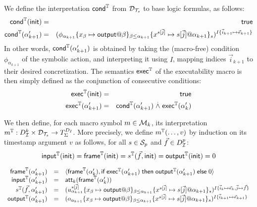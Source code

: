 We define the interpretation $\textsf{cond}^{\mathbb{T}}$ from $\mathcal{D}_{\mathcal{T}_s}$
to base logic formulas, as follows:
\begin{eqnarray*}
  \mcond^\TM(\tinit) &=& \true \\
  \mcond^\TM(\alpha'_{k+1}) &=&
    \interp{\phi_{\alpha_{k+1}}
    \{x_\beta\mapsto\mout@\beta\}_{\beta\leq \alpha_{k+1}}
    \{x^{s[\vec{j}]}\mapsto
      s[\vec{j}]@\alpha_{k+1}\}_s
    }^{I\{\vec{i}_{k+1}\mapsto\vec{e}_{k+1}\}}
\end{eqnarray*}
In other words, $\textsf{cond}^{\mathbb{T}}(\alpha'_{k+1})$ is obtained by taking the
(macro-free) condition $\phi_{\alpha_{k+1}}$ of the symbolic action, and
interpreting it using $I$, mapping indices $\vec{i}_{k+1}$ to their
desired concretization.
The semantics $\textsf{exec}^{\mathbb{T}}$ of the executability macro is then simply defined as
the conjunction of consecutive conditions:
\begin{eqnarray*}
  \textsf{exec}^{\mathbb{T}}(\mathsf{init}) &=& \textsf{true} \\
  \textsf{exec}^{\mathbb{T}}(\alpha'_{k+1}) &=&
    \textsf{cond}^{\mathbb{T}}(\alpha'_{k+1})
    \stackrel{.}{\wedge}
    \textsf{exec}^{\mathbb{T}}(\alpha'_k)
\end{eqnarray*}

We then define, for each macro symbol $m\in\mathcal{M}_k$,
its interpretation $m^{\mathbb{T}} : D_{\mathcal{I}}^k \times \mathcal{D}_{\mathcal{T}_s} \to T_\Sigma^{D_I}$.
More precisely, we define $m^{\mathbb{T}}(\ldots,v)$ by induction on its timestamp
argument $v$ as follows, for all $s \in \mathcal{S}_p$ and $\vec{f} \in D_{\mathcal{I}}^p$:
\[
    \textsf{input}^{\mathbb{T}}(\mathsf{init}) = \textsf{frame}^{\mathbb{T}}(\mathsf{init}) = s^{\mathbb{T}}(\vec{f},\mathsf{init})
    = \textsf{output}^{\mathbb{T}}(\mathsf{init}) = 0\]


\[\begin{array}{rll}
    \mframe^\TM(\alpha'_{k+1}) &=&
    \langle \mframe^\TM(\alpha'_k),
    \myif \mexec^\TM(\alpha'_{k+1}) \mythen \mout^\TM(\alpha'_{k+1}) \myelse 0
    \rangle
    \\
    \minp^\TM(\alpha'_{k+1}) &=&
    \att_{k}(\mframe^\TM(\alpha'_k))
  \\
    s^\TM(\vec{f},\alpha'_{k+1}) &=&
    \interp{
      u_{\alpha_{k+1}}^{s[\vec{j}]}
      \{x_\beta\mapsto\mout@\beta\}_{\beta\leq \alpha_{k+1}}
      \{x^{s[\vec{j}]}\mapsto
        s[\vec{j}]@\alpha_{k+1}\}_s
    }^{
      I\{\vec{i}_k\mapsto\vec{e}_k,\vec{j}\mapsto\vec{f}\}}
  \\
    \mout^\TM(\alpha'_{k+1}) &=&
      \interp{
        o_{\alpha_{k+1}}
        \{x_\beta\mapsto\mout@\beta\}_{\beta\leq \alpha_{k+1}}
        \{x^{s[\vec{j}]}\mapsto
          s[\vec{j}]@\alpha_{k+1}\}_s
        }^{I\{\vec{i}_{k+1}\mapsto\vec{e}_{k+1}\}}
\end{array}\]


